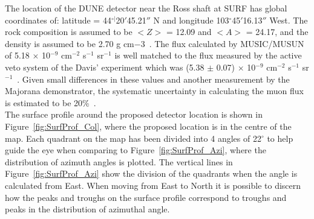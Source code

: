 The location of the DUNE detector near the Ross shaft at SURF has global coordinates of: latitude = 44$^{\circ|}$20$'$45.21$''$ N and longitude 103$^{\circ}$45$'$16.13$''$ West. The rock composition is assumed to be $< Z >$ = 12.09 and $< A >$ = 24.17, and the density is assumed to be 2.70 g cm${-3}$~\citep{Mei:2009py}. The flux calculated by MUSIC/MUSUN of 5.18 $\times$ 10$^{-9}$ cm$^{-2}$ s$^{-1}$ sr$^{-1}$ is well matched to the flux measured by the active veto system of the Davis' experiment which was (5.38 $\pm$ 0.07) $\times$ 10$^{-9}$ cm$^{-2}$ s$^{-1}$ sr$^{-1}$~\citep{PhysRevD.27.1444}. Given small differences in these values and another measurement by the Majorana demonstrator, the systematic uncertainty in calculating the muon flux is estimated to be 20\%~\citep{NDKTFNote}. \\

The surface profile around the proposed detector location is shown in Figure~\ref{fig:SurfProf_Col}, where the proposed location is in the centre of the map. Each quadrant on the map has been divided into 4 angles of 22$^{\circ}$ to help guide the eye when comparing to Figure~\ref{fig:SurfProf_Azi}, where the distribution of azimuth angles is plotted. The vertical lines in Figure~\ref{fig:SurfProf_Azi} show the division of the quadrants when the angle is calculated from East. When moving from East to North it is possible to discern how the peaks and troughs on the surface profile correspond to troughs and peaks in the distribution of azimuthal angle. \\

